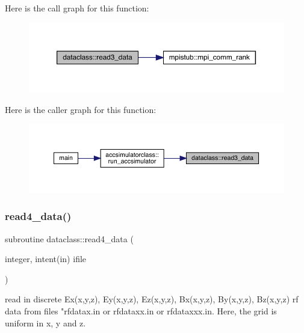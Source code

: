 Here is the call graph for this function\+:\nopagebreak
\begin{figure}[H]
\begin{center}
\leavevmode
\includegraphics[width=350pt]{namespacedataclass_a39afae6095340e01362de7d4876aee60_cgraph}
\end{center}
\end{figure}
Here is the caller graph for this function\+:\nopagebreak
\begin{figure}[H]
\begin{center}
\leavevmode
\includegraphics[width=350pt]{namespacedataclass_a39afae6095340e01362de7d4876aee60_icgraph}
\end{center}
\end{figure}
\mbox{\label{namespacedataclass_a2ef1f00ff4295094270a70c5d3763019}} 
\subsubsection{\texorpdfstring{read4\_data()}{read4\_data()}}
{\footnotesize\ttfamily subroutine dataclass\+::read4\+\_\+data (\begin{DoxyParamCaption}\item[{integer, intent(in)}]{ifile }\end{DoxyParamCaption})}



read in discrete Ex(x,y,z), Ey(x,y,z), Ez(x,y,z), Bx(x,y,z), By(x,y,z), Bz(x,y,z) rf data from files "rfdatax.\+in or rfdataxx.\+in or rfdataxxx.\+in. Here, the grid is uniform in x, y and z. 


